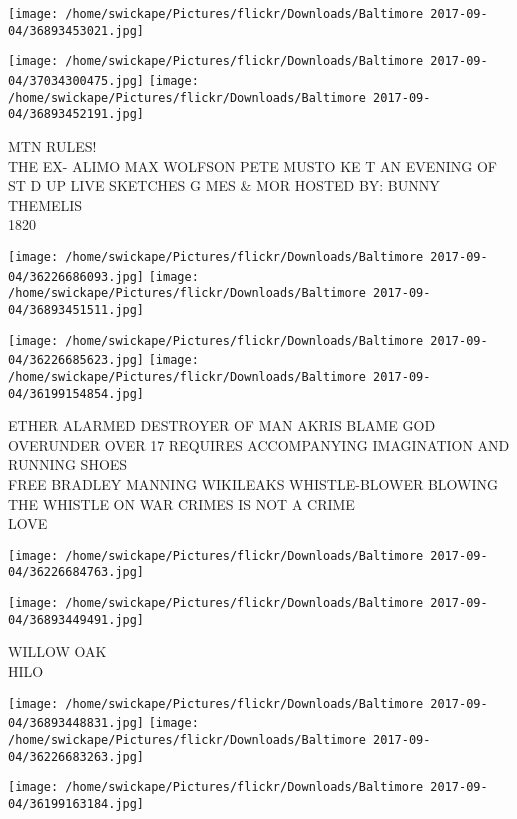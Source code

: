 \documentclass[10pt,letterpaper]{article}
\begin{document}
\texttt{[image: /home/swickape/Pictures/flickr/Downloads/Baltimore 2017-09-04/36893453021.jpg]}

\vspace{0.25in}
\texttt{[image: /home/swickape/Pictures/flickr/Downloads/Baltimore 2017-09-04/37034300475.jpg]}
\texttt{[image: /home/swickape/Pictures/flickr/Downloads/Baltimore 2017-09-04/36893452191.jpg]}

MTN RULES!\\
THE EX{-} ALIMO MAX WOLFSON PETE MUSTO KE T AN EVENING OF ST D UP LIVE SKETCHES G MES \& MOR HOSTED BY: BUNNY THEMELIS\\
1820
\pagebreak

\texttt{[image: /home/swickape/Pictures/flickr/Downloads/Baltimore 2017-09-04/36226686093.jpg]}
\texttt{[image: /home/swickape/Pictures/flickr/Downloads/Baltimore 2017-09-04/36893451511.jpg]}

\texttt{[image: /home/swickape/Pictures/flickr/Downloads/Baltimore 2017-09-04/36226685623.jpg]}
\texttt{[image: /home/swickape/Pictures/flickr/Downloads/Baltimore 2017-09-04/36199154854.jpg]}

ETHER ALARMED DESTROYER OF MAN AKRIS BLAME GOD\\
OVERUNDER OVER 17 REQUIRES ACCOMPANYING IMAGINATION AND RUNNING SHOES\\
FREE BRADLEY MANNING WIKILEAKS WHISTLE{-}BLOWER BLOWING THE WHISTLE ON WAR CRIMES IS NOT A CRIME\\
LOVE
\pagebreak

\texttt{[image: /home/swickape/Pictures/flickr/Downloads/Baltimore 2017-09-04/36226684763.jpg]}

\vspace{0.25in}
\texttt{[image: /home/swickape/Pictures/flickr/Downloads/Baltimore 2017-09-04/36893449491.jpg]}

WILLOW OAK\\
HILO
\pagebreak

\texttt{[image: /home/swickape/Pictures/flickr/Downloads/Baltimore 2017-09-04/36893448831.jpg]}
\texttt{[image: /home/swickape/Pictures/flickr/Downloads/Baltimore 2017-09-04/36226683263.jpg]}

\vspace{0.25in}
\texttt{[image: /home/swickape/Pictures/flickr/Downloads/Baltimore 2017-09-04/36199163184.jpg]}
\end{document}

